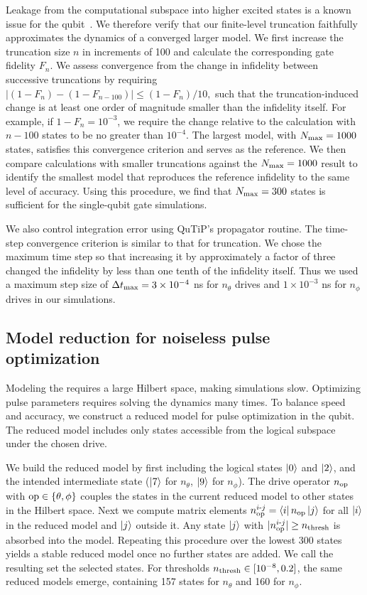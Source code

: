 Leakage from the computational subspace into higher excited states is a known issue for the \zps qubit~\cite{PremkumarAPS2023,premkumar2023hamiltonian}.
We therefore verify that our finite-level truncation faithfully approximates the dynamics of a converged larger model.
We first increase the truncation size $n$ in increments of 100 and calculate the corresponding gate fidelity $F_n$.
We assess convergence from the change in infidelity between successive truncations by requiring
$|(1-F_n)-(1-F_{n-100})|\leq (1-F_n)/10,$
such that the truncation-induced change is at least one order of magnitude smaller than the infidelity itself.
For example, if $1-F_n=10^{-3}$, we require the change relative to the calculation with $n-100$ states to be no greater than $10^{-4}$.
The largest model, with $N_{\rm max}=1000$ states, satisfies this convergence criterion and serves as the reference.
We then compare calculations with smaller truncations against the $N_{\rm max}=1000$ result to identify the smallest model that reproduces the reference infidelity to the same level of accuracy.
Using this procedure, we find that $N_{\rm max}=300$ states is sufficient for the single-qubit gate simulations.

We also control integration error using QuTiP’s propagator routine.
The time-step convergence criterion is similar to that for truncation.
We chose the maximum time step so that increasing it by approximately a factor of three changed the infidelity by less than one tenth of the infidelity itself.
Thus we used a maximum step size of $\Delta t_{\rm max}=3\times10^{-4}$ ns for $n_\theta$ drives and $1\times10^{-3}$ ns for $n_\phi$ drives in our simulations.

\subsection{Model reduction for noiseless pulse optimization}
\label{zp:app:sec:model_reduce_1q}
Modeling the \zps requires a large Hilbert space, making simulations slow.
Optimizing pulse parameters requires solving the dynamics many times.
To balance speed and accuracy, we construct a reduced model for pulse optimization in the \zps qubit.
The reduced model includes only states accessible from the logical subspace under the chosen drive.

We build the reduced model by first including the logical states $\ket{0}$ and $\ket{2}$, and the intended intermediate state ($\ket{7}$ for $n_\theta$, $\ket{9}$ for $n_\phi$).
The drive operator $n_{\rm op}$ with ${\rm op} \in \{\theta, \phi\}$ couples the states in the current reduced model to other states in the Hilbert space.
Next we compute matrix elements $n_{\rm op}^{i\text{-}j}=\bra{i}n_{\rm op}\ket{j}$ for all $\ket{i}$ in the reduced model and $\ket{j}$ outside it.
Any state $\ket{j}$ with $|n_{\rm op}^{i\text{-}j}|\geq n_{\rm thresh}$ is absorbed into the model.
Repeating this procedure over the lowest 300 states yields a stable reduced model once no further states are added.
We call the resulting set the selected states.
For thresholds $n_{\rm thresh}\in[10^{-8},0.2]$, the same reduced models emerge, containing 157 states for $n_\theta$ and 160 for $n_\phi$.

